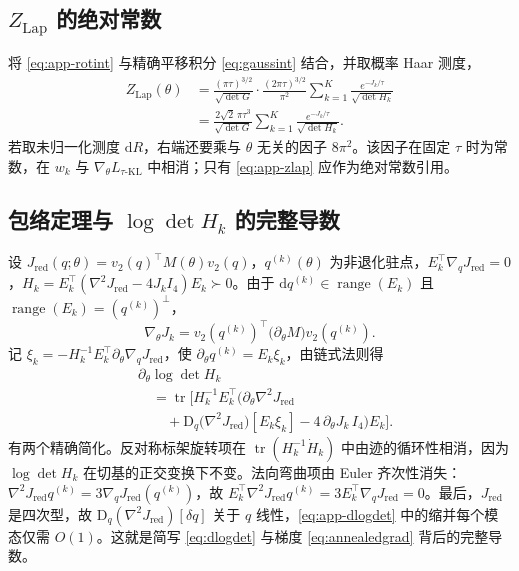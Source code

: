 \subsection*{\texorpdfstring{$Z_{\mathrm{Lap}}$}{Z\_Lap} 的绝对常数}

将 \eqref{eq:app-rotint} 与精确平移积分 \eqref{eq:gaussint} 结合，并取概率 Haar 测度，
\begin{equation}
\begin{split}
Z_{\mathrm{Lap}}(\theta)&=\frac{(\pi\tau)^{3/2}}{\sqrt{\det G}}\cdot\frac{(2\pi\tau)^{3/2}}{\pi^2}\sum_{k=1}^K\frac{e^{-J_k/\tau}}{\sqrt{\det H_k}}\\
&=\frac{2\sqrt2\,\pi\tau^3}{\sqrt{\det G}}\sum_{k=1}^K\frac{e^{-J_k/\tau}}{\sqrt{\det H_k}} .
\end{split}
\label{eq:app-zlap}
\end{equation}
若取未归一化测度 $\mathrm{d}R$，右端还要乘与 $\theta$ 无关的因子 $8\pi^2$。该因子在固定 $\tau$ 时为常数，在 $w_k$ 与 $\nabla_\theta L_{\tau\text{-KL}}$ 中相消；只有 \eqref{eq:app-zlap} 应作为绝对常数引用。

\subsection*{包络定理与 \texorpdfstring{$\log\det H_k$}{log det H\_k} 的完整导数}

设 $J_{\mathrm{red}}(q;\theta)=v_2(q)^\top M(\theta)v_2(q)$，$q^{(k)}(\theta)$ 为非退化驻点，$E_k^\top\nabla_qJ_{\mathrm{red}}=0$，$H_k=E_k^\top(\nabla^2J_{\mathrm{red}}-4J_kI_4)E_k\succ0$。由于 $\mathrm{d}q^{(k)}\in\operatorname{range}(E_k)$ 且 $\operatorname{range}(E_k)=(q^{(k)})^\perp$，
\begin{equation}
\nabla_\theta J_k=v_2(q^{(k)})^\top\big(\partial_\theta M\big)v_2(q^{(k)}) .
\label{eq:app-envelope}
\end{equation}
记 $\xi_k=-H_k^{-1}E_k^\top\partial_\theta\nabla_qJ_{\mathrm{red}}$，使 $\partial_\theta q^{(k)}=E_k\xi_k$，由链式法则得
\begin{equation}
\begin{split}
&\partial_\theta\log\det H_k\\
&\quad=\operatorname{tr}\!\Big[H_k^{-1}E_k^\top\Big(\partial_\theta\nabla^2J_{\mathrm{red}}\\
&\qquad+\mathrm{D}_q\big(\nabla^2J_{\mathrm{red}}\big)[E_k\xi_k]
-4\,\partial_\theta J_k\,I_4\Big)E_k\Big].
\end{split}
\label{eq:app-dlogdet}
\end{equation}
有两个精确简化。反对称标架旋转项在 $\operatorname{tr}(H_k^{-1}\dot H_k)$ 中由迹的循环性相消，因为 $\log\det H_k$ 在切基的正交变换下不变。法向弯曲项由 Euler 齐次性消失：$\nabla^2J_{\mathrm{red}}q^{(k)}=3\nabla_qJ_{\mathrm{red}}(q^{(k)})$，故 $E_k^\top\nabla^2J_{\mathrm{red}}q^{(k)}=3E_k^\top\nabla_qJ_{\mathrm{red}}=0$。最后，$J_{\mathrm{red}}$ 是四次型，故 $\mathrm{D}_q(\nabla^2J_{\mathrm{red}})[\delta q]$ 关于 $q$ 线性，\eqref{eq:app-dlogdet} 中的缩并每个模态仅需 $O(1)$。这就是简写 \eqref{eq:dlogdet} 与梯度 \eqref{eq:annealedgrad} 背后的完整导数。
